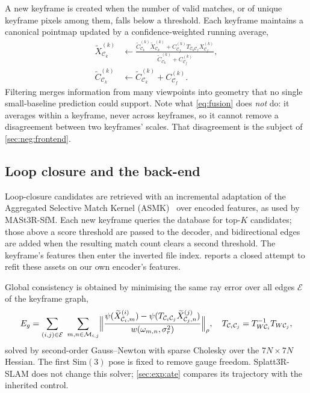 A new keyframe is created when the number of valid matches, or of unique
keyframe pixels among them, falls below a threshold. Each keyframe maintains a
canonical pointmap updated by a confidence-weighted running average,
\begin{equation}
\begin{aligned}
\widetilde X_{\mathcal C_k}^{(k)}
&\leftarrow
\frac{\widetilde C_{\mathcal C_k}^{(k)}
      \widetilde X_{\mathcal C_k}^{(k)}
      +C_{\mathcal C_f}^{(k)}
       T_{\mathcal C_k\mathcal C_f}X_{\mathcal C_f}^{(k)}}
     {\widetilde C_{\mathcal C_k}^{(k)}+C_{\mathcal C_f}^{(k)}},\\
\widetilde C_{\mathcal C_k}^{(k)}
&\leftarrow\widetilde C_{\mathcal C_k}^{(k)}
             +C_{\mathcal C_f}^{(k)} .
\end{aligned}
\label{eq:fusion}
\end{equation}
Filtering merges information from many viewpoints into geometry that no single
small-baseline prediction could support. Note what \cref{eq:fusion} does
\emph{not} do: it averages within a keyframe, never across keyframes, so it
cannot remove a disagreement between two keyframes' scales. That disagreement
is the subject of \cref{sec:neg:frontend}.

\subsection{Loop closure and the back-end}

Loop-closure candidates are retrieved with an incremental adaptation of the
Aggregated Selective Match Kernel (ASMK)~\cite{tolias2016asmk} over encoded
features, as used by MASt3R-SfM. Each new keyframe queries the database for
top-$K$ candidates; those above a score threshold are passed to the decoder,
and bidirectional edges are added when the resulting match count clears a
second threshold. The keyframe's features then enter the inverted file index.
 reports a closed attempt to refit these assets on our
own encoder's features.

Global consistency is obtained by minimising the same ray error over all edges
$\mathcal{E}$ of the keyframe graph,
\begin{equation}
E_g=\sum_{(i,j)\in\mathcal{E}}\ \sum_{m,n\in\mathcal M_{i,j}}
\Bigl\lVert
\frac{\psi(\widetilde X_{\mathcal C_i,m}^{(i)})
 -\psi(T_{\mathcal C_i\mathcal C_j}
       \widetilde X_{\mathcal C_j,n}^{(j)})}
{w(\omega_{m,n},\sigma_r^2)}
\Bigr\rVert_\rho,
\quad
T_{\mathcal C_i\mathcal C_j}=T_{W\mathcal C_i}^{-1}T_{W\mathcal C_j},
\label{eq:global}
\end{equation}
solved by second-order Gauss--Newton with sparse Cholesky over the $7N\times7N$
Hessian. The first $\mathrm{Sim}(3)$ pose is fixed to remove gauge freedom.
Splatt3R-SLAM does not change this solver; \cref{sec:exp:ate} compares its
trajectory with the inherited control.


